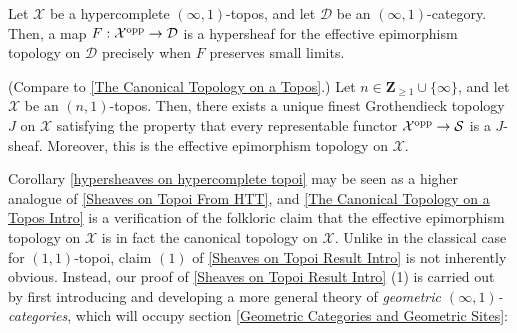 \documentclass[10pt]{article}
\newcommand{\mS}{\mathcal S}
\newcommand{\cD}{\mathcal{D}}
\newcommand{\cX}{\mathcal{X}}
\newcommand{\ZZ}{\mathbb{Z}}
\def\ZZ{{\mathbf Z}}
\theoremstyle{witharg}
\theoremstyle{witharg}
\theoremstyle{witharg2}
\begin{document}
\begin{corollary}{}\label{hypersheaves on hypercomplete topoi}

    Let $\cX$ be a hypercomplete $(\infty,1)$-topos, and let $\cD$ be an $(\infty,1)$-category. Then, a map $F:\cX^{\textnormal{opp}}\rightarrow \cD$ is a hypersheaf for the effective epimorphism topology on $\cD$ precisely when $F$ preserves small limits. 
    
\end{corollary}


\begin{corollary}{}\label{The Canonical Topology on a Topos Intro}

    (Compare to \ref{The Canonical Topology on a Topos}.) Let $n\in \ZZ_{\geq 1}\cup \{\infty\}$, and let $\cX$ be an $(n,1)$-topos. Then, there exists a unique finest Grothendieck topology $J$ on $\cX$ satisfying the property that every representable functor $\cX^{\textnormal{opp}}\rightarrow \mS$ is a $J$-sheaf. Moreover, this is the effective epimorphism topology on $\cX$. 
    
\end{corollary}



\noindent Corollary \ref{hypersheaves on hypercomplete topoi} may be seen as a higher analogue of \ref{Sheaves on Topoi From HTT}, and \ref{The Canonical Topology on a Topos Intro} is a verification of the folkloric claim that the effective epimorphism topology on $\cX$ is in fact the canonical topology on $\cX$. Unlike in the classical case for $(1,1)$-topoi, claim $(1)$ of \ref{Sheaves on Topoi Result Intro} is not inherently obvious. Instead, our proof of \ref{Sheaves on Topoi Result Intro} (1) is carried out by first introducing and developing a more general theory of \emph{geometric $(\infty,1)$-categories}, which will occupy section \ref{Geometric Categories and Geometric Sites}: 
\end{document}

